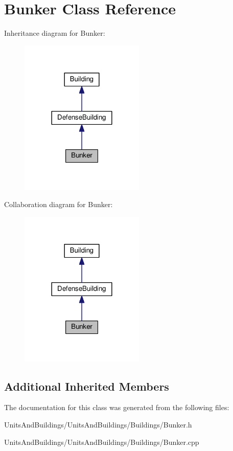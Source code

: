 \hypertarget{class_bunker}{}\section{Bunker Class Reference}
\label{class_bunker}


Inheritance diagram for Bunker\+:
\nopagebreak
\begin{figure}[H]
\begin{center}
\leavevmode
\includegraphics[width=168pt]{class_bunker__inherit__graph}
\end{center}
\end{figure}


Collaboration diagram for Bunker\+:
\nopagebreak
\begin{figure}[H]
\begin{center}
\leavevmode
\includegraphics[width=168pt]{class_bunker__coll__graph}
\end{center}
\end{figure}
\subsection*{Additional Inherited Members}


The documentation for this class was generated from the following files\+:\begin{DoxyCompactItemize}
\item 
Units\+And\+Buildings/\+Units\+And\+Buildings/\+Buildings/Bunker.\+h\item 
Units\+And\+Buildings/\+Units\+And\+Buildings/\+Buildings/Bunker.\+cpp\end{DoxyCompactItemize}
